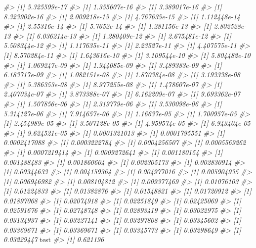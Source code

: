 \documentclass[]{article}
\newenvironment{Shaded}{\begin{snugshade}}{\end{snugshade}}
\newcommand{\CommentTok}[1]{\textcolor[rgb]{0.56,0.35,0.01}{\textit{#1}}}
\newcommand{\NormalTok}[1]{#1}
\begin{document}
\begin{Shaded}
\begin{Highlighting}[]
\CommentTok{#> [1] 5.325599e-17}
\CommentTok{#> [1] 1.355607e-16}
\CommentTok{#> [1] 3.389017e-16}
\CommentTok{#> [1] 8.323902e-16}
\CommentTok{#> [1] 2.009218e-15}
\CommentTok{#> [1] 4.767635e-15}
\CommentTok{#> [1] 1.112448e-14}
\CommentTok{#> [1] 2.55316e-14}
\CommentTok{#> [1] 5.7652e-14}
\CommentTok{#> [1] 1.281156e-13}
\CommentTok{#> [1] 2.802528e-13}
\CommentTok{#> [1] 6.036214e-13}
\CommentTok{#> [1] 1.280409e-12}
\CommentTok{#> [1] 2.675481e-12}
\CommentTok{#> [1] 5.508344e-12}
\CommentTok{#> [1] 1.117635e-11}
\CommentTok{#> [1] 2.23527e-11}
\CommentTok{#> [1] 4.407575e-11}
\CommentTok{#> [1] 8.570284e-11}
\CommentTok{#> [1] 1.643616e-10}
\CommentTok{#> [1] 3.109544e-10}
\CommentTok{#> [1] 5.804482e-10}
\CommentTok{#> [1] 1.069247e-09}
\CommentTok{#> [1] 1.944085e-09}
\CommentTok{#> [1] 3.489383e-09}
\CommentTok{#> [1] 6.183717e-09}
\CommentTok{#> [1] 1.082151e-08}
\CommentTok{#> [1] 1.870384e-08}
\CommentTok{#> [1] 3.193338e-08}
\CommentTok{#> [1] 5.386353e-08}
\CommentTok{#> [1] 8.977255e-08}
\CommentTok{#> [1] 1.478607e-07}
\CommentTok{#> [1] 2.407034e-07}
\CommentTok{#> [1] 3.873388e-07}
\CommentTok{#> [1] 6.162209e-07}
\CommentTok{#> [1] 9.693362e-07}
\CommentTok{#> [1] 1.507856e-06}
\CommentTok{#> [1] 2.319779e-06}
\CommentTok{#> [1] 3.530098e-06}
\CommentTok{#> [1] 5.314127e-06}
\CommentTok{#> [1] 7.914657e-06}
\CommentTok{#> [1] 1.16637e-05}
\CommentTok{#> [1] 1.700957e-05}
\CommentTok{#> [1] 2.454989e-05}
\CommentTok{#> [1] 3.507128e-05}
\CommentTok{#> [1] 4.959574e-05}
\CommentTok{#> [1] 6.943404e-05}
\CommentTok{#> [1] 9.624521e-05}
\CommentTok{#> [1] 0.0001321013}
\CommentTok{#> [1] 0.0001795551}
\CommentTok{#> [1] 0.0002417088}
\CommentTok{#> [1] 0.0003222784}
\CommentTok{#> [1] 0.0004256507}
\CommentTok{#> [1] 0.0005569262}
\CommentTok{#> [1] 0.0007219414}
\CommentTok{#> [1] 0.0009272641}
\CommentTok{#> [1] 0.001180154}
\CommentTok{#> [1] 0.001488483}
\CommentTok{#> [1] 0.001860604}
\CommentTok{#> [1] 0.002305173}
\CommentTok{#> [1] 0.002830914}
\CommentTok{#> [1] 0.00344633}
\CommentTok{#> [1] 0.004159364}
\CommentTok{#> [1] 0.004977016}
\CommentTok{#> [1] 0.005904935}
\CommentTok{#> [1] 0.006946982}
\CommentTok{#> [1] 0.008104812}
\CommentTok{#> [1] 0.009377469}
\CommentTok{#> [1] 0.01076103}
\CommentTok{#> [1] 0.01224833}
\CommentTok{#> [1] 0.01382876}
\CommentTok{#> [1] 0.01548821}
\CommentTok{#> [1] 0.01720912}
\CommentTok{#> [1] 0.01897068}
\CommentTok{#> [1] 0.02074918}
\CommentTok{#> [1] 0.02251849}
\CommentTok{#> [1] 0.02425069}
\CommentTok{#> [1] 0.02591676}
\CommentTok{#> [1] 0.02748748}
\CommentTok{#> [1] 0.02893419}
\CommentTok{#> [1] 0.03022975}
\CommentTok{#> [1] 0.03134937}
\CommentTok{#> [1] 0.03227141}
\CommentTok{#> [1] 0.03297808}
\CommentTok{#> [1] 0.03345602}
\CommentTok{#> [1] 0.03369671}
\CommentTok{#> [1] 0.03369671}
\CommentTok{#> [1] 0.03345773}
\CommentTok{#> [1] 0.03298649}
\CommentTok{#> [1] 0.03229447}
\NormalTok{test}
\CommentTok{#> [1] 0.621196}
\end{Highlighting}
\end{Shaded}
\end{document}
